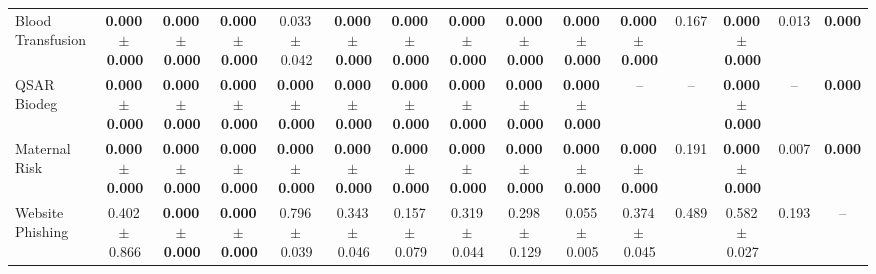 \documentclass[8pt]{extarticle}
\begin{document}
\begin{longtable}{l*{14}{c}}
Blood Transfusion & \textbf{0.000\,$\pm$\,0.000} & \textbf{0.000\,$\pm$\,0.000} & \textbf{0.000\,$\pm$\,0.000} & 0.033\,$\pm$\,0.042 & \textbf{0.000\,$\pm$\,0.000} & \textbf{0.000\,$\pm$\,0.000} & \textbf{0.000\,$\pm$\,0.000} & \textbf{0.000\,$\pm$\,0.000} & \textbf{0.000\,$\pm$\,0.000} & \textbf{0.000\,$\pm$\,0.000} & 0.167 & \textbf{0.000\,$\pm$\,0.000} & 0.013 & \textbf{0.000} \\
QSAR Biodeg & \textbf{0.000\,$\pm$\,0.000} & \textbf{0.000\,$\pm$\,0.000} & \textbf{0.000\,$\pm$\,0.000} & \textbf{0.000\,$\pm$\,0.000} & \textbf{0.000\,$\pm$\,0.000} & \textbf{0.000\,$\pm$\,0.000} & \textbf{0.000\,$\pm$\,0.000} & \textbf{0.000\,$\pm$\,0.000} & \textbf{0.000\,$\pm$\,0.000} & -- & -- & \textbf{0.000\,$\pm$\,0.000} & -- & \textbf{0.000} \\
Maternal Risk & \textbf{0.000\,$\pm$\,0.000} & \textbf{0.000\,$\pm$\,0.000} & \textbf{0.000\,$\pm$\,0.000} & \textbf{0.000\,$\pm$\,0.000} & \textbf{0.000\,$\pm$\,0.000} & \textbf{0.000\,$\pm$\,0.000} & \textbf{0.000\,$\pm$\,0.000} & \textbf{0.000\,$\pm$\,0.000} & \textbf{0.000\,$\pm$\,0.000} & \textbf{0.000\,$\pm$\,0.000} & 0.191 & \textbf{0.000\,$\pm$\,0.000} & 0.007 & \textbf{0.000} \\
Website Phishing & 0.402\,$\pm$\,0.866 & \textbf{0.000\,$\pm$\,0.000} & \textbf{0.000\,$\pm$\,0.000} & 0.796\,$\pm$\,0.039 & 0.343\,$\pm$\,0.046 & 0.157\,$\pm$\,0.079 & 0.319\,$\pm$\,0.044 & 0.298\,$\pm$\,0.129 & 0.055\,$\pm$\,0.005 & 0.374\,$\pm$\,0.045 & 0.489 & 0.582\,$\pm$\,0.027 & 0.193 & -- \\
\end{longtable}
\end{document}
